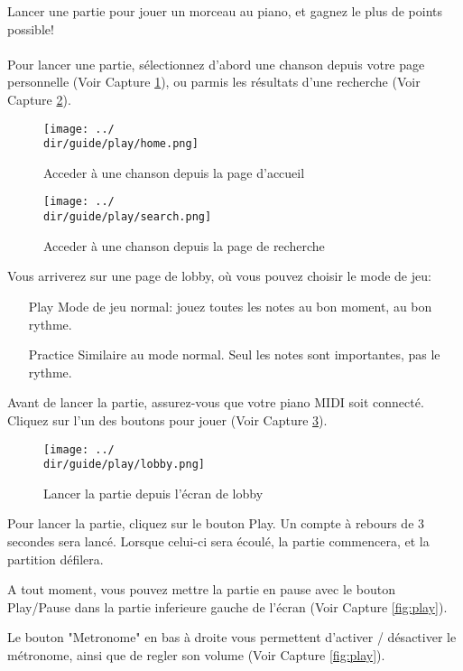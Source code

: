 Lancer une partie pour jouer un morceau au piano, et gagnez le plus de points possible!
\\\\
Pour lancer une partie, sélectionnez d’abord une chanson depuis votre page personnelle (Voir Capture \ref{fig:access-song}), ou parmis les résultats d’une recherche (Voir Capture \ref{fig:search-song}).

\begin{figure}[H]
	\texttt{[image: ../\\dir/guide/play/home.png]}
	\caption{Acceder à une chanson depuis la page d'accueil}
	\label{fig:access-song}
\end{figure}

\begin{figure}[H]
	\texttt{[image: ../\\dir/guide/play/search.png]}
	\caption{Acceder à une chanson depuis la page de recherche}
	\label{fig:search-song}
\end{figure}

Vous arriverez sur une page de lobby, où vous pouvez choisir le mode de jeu:

\begin{itemize}
	\item[Play] Mode de jeu normal: jouez toutes les notes au bon moment, au bon rythme.
	\item[Practice] Similaire au mode normal. Seul les notes sont importantes, pas le rythme.
\end{itemize}

Avant de lancer la partie, assurez-vous que votre piano MIDI soit connecté.
Cliquez sur l'un des boutons pour jouer (Voir Capture \ref{fig:choose-play-mode}).

\begin{figure}[H]
	\texttt{[image: ../\\dir/guide/play/lobby.png]}
	\caption{Lancer la partie depuis l'écran de lobby}
	\label{fig:choose-play-mode}
\end{figure}

Pour lancer la partie, cliquez sur le bouton Play. Un compte à rebours de 3 secondes sera lancé. Lorsque celui-ci sera écoulé, la partie commencera, et la partition défilera.

A tout moment, vous pouvez mettre la partie en pause avec le bouton Play/Pause dans la partie inferieure gauche de l'écran (Voir Capture \ref{fig:play}).

Le bouton "Metronome" en bas à droite vous permettent d'activer / désactiver le métronome, ainsi que de regler son volume (Voir Capture \ref{fig:play}).

